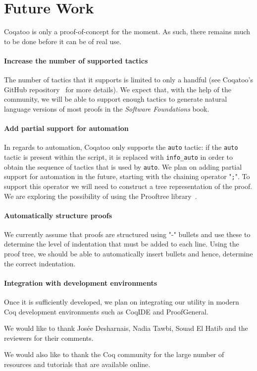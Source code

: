 \documentclass[sigplan,9pt]{acmart}\settopmatter{printfolios=true,printccs=false,printacmref=false}
\begin{document}
\pagebreak
\section{Future Work}
Coqatoo is only a proof-of-concept for the moment. As such, there remains much to be done before it can be of real use. 

\paragraph{Increase the number of supported tactics}
The number of tactics that it supports is limited to only a handful (see Coqatoo's GitHub repository~\cite{Coqatoo} for more details). We expect that, with the help of the community, we will be able to support enough tactics to generate natural language versions of most proofs in the \emph{Software Foundations} book.

\paragraph{Add partial support for automation}
In regards to automation, Coqatoo only supports the \lstinline{auto} tactic: if the \lstinline{auto} tactic is present within the script, it is replaced with \lstinline{info_auto} in order to obtain the sequence of tactics that is used by \lstinline{auto}. We plan on adding partial support for automation in the future, starting with the chaining operator "\lstinline{;}". To support this operator we will need to construct a tree representation of the proof. We are exploring the possibility of using the Prooftree library~\cite{Prooftree}.


\paragraph{Automatically structure proofs}
We currently assume that proofs are structured using "-" bullets and use these to determine the level of indentation that must be added to each line. Using the proof tree, we should be able to automatically insert bullets and hence, determine the correct indentation.

\paragraph{Integration with development environments} Once it is sufficiently developed, we plan on integrating our utility in modern Coq development environments such as CoqIDE and ProofGeneral.

\newpage

\begin{acks}
  We would like to thank Josée Desharnais, Nadia Tawbi, Souad El Hatib and the reviewers for their comments.

  We would also like to thank the Coq community for the large number of resources and tutorials that are available online.
\end{acks}


\end{document}
